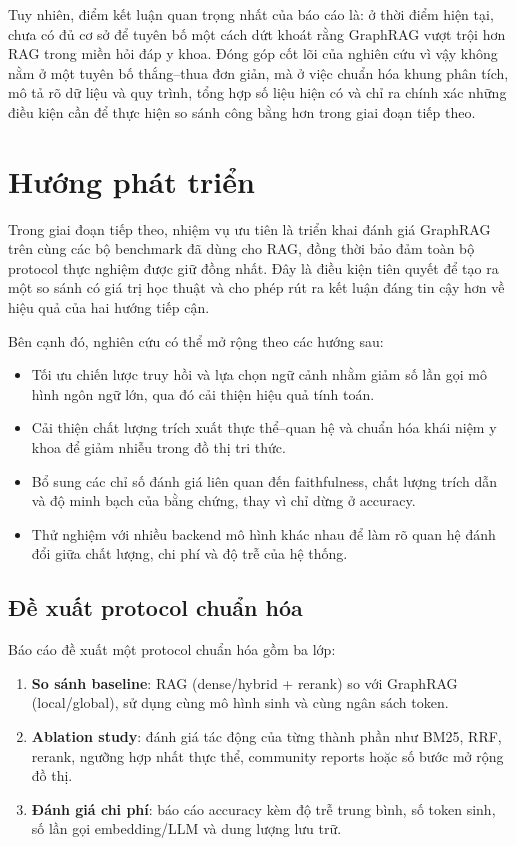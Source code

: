 \documentclass[a4paper,12pt,twoside]{report}
\begin{document}
Tuy nhiên, điểm kết luận quan trọng nhất của báo cáo là: ở thời điểm hiện tại, chưa có đủ cơ sở để tuyên bố một cách dứt khoát rằng GraphRAG vượt trội hơn RAG trong miền hỏi đáp y khoa. Đóng góp cốt lõi của nghiên cứu vì vậy không nằm ở một tuyên bố thắng--thua đơn giản, mà ở việc chuẩn hóa khung phân tích, mô tả rõ dữ liệu và quy trình, tổng hợp số liệu hiện có và chỉ ra chính xác những điều kiện cần để thực hiện so sánh công bằng hơn trong giai đoạn tiếp theo.

\section{Hướng phát triển}
Trong giai đoạn tiếp theo, nhiệm vụ ưu tiên là triển khai đánh giá GraphRAG trên cùng các bộ benchmark đã dùng cho RAG, đồng thời bảo đảm toàn bộ protocol thực nghiệm được giữ đồng nhất. Đây là điều kiện tiên quyết để tạo ra một so sánh có giá trị học thuật và cho phép rút ra kết luận đáng tin cậy hơn về hiệu quả của hai hướng tiếp cận.

Bên cạnh đó, nghiên cứu có thể mở rộng theo các hướng sau:
\begin{itemize}[nosep]
  \item Tối ưu chiến lược truy hồi và lựa chọn ngữ cảnh nhằm giảm số lần gọi mô hình ngôn ngữ lớn, qua đó cải thiện hiệu quả tính toán.
  \item Cải thiện chất lượng trích xuất thực thể--quan hệ và chuẩn hóa khái niệm y khoa để giảm nhiễu trong đồ thị tri thức.
  \item Bổ sung các chỉ số đánh giá liên quan đến faithfulness, chất lượng trích dẫn và độ minh bạch của bằng chứng, thay vì chỉ dừng ở accuracy.
  \item Thử nghiệm với nhiều backend mô hình khác nhau để làm rõ quan hệ đánh đổi giữa chất lượng, chi phí và độ trễ của hệ thống.
\end{itemize}

\subsection{Đề xuất protocol chuẩn hóa}
Báo cáo đề xuất một protocol chuẩn hóa gồm ba lớp:
\begin{enumerate}[nosep]
  \item \textbf{So sánh baseline}: RAG (dense/hybrid + rerank) so với GraphRAG (local/global), sử dụng cùng mô hình sinh và cùng ngân sách token.
  \item \textbf{Ablation study}: đánh giá tác động của từng thành phần như BM25, RRF, rerank, ngưỡng hợp nhất thực thể, community reports hoặc số bước mở rộng đồ thị.
  \item \textbf{Đánh giá chi phí}: báo cáo accuracy kèm độ trễ trung bình, số token sinh, số lần gọi embedding/LLM và dung lượng lưu trữ.
\end{enumerate}
\end{document}

